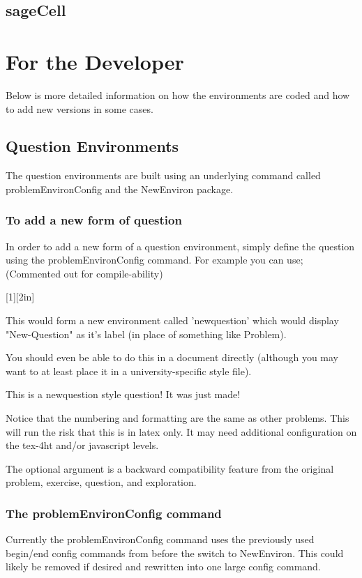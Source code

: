 \documentclass{ximera}
\begin{document}
\subsection{sageCell}

\newpage
\section{For the Developer}
Below is more detailed information on how the environments are coded and how to add new versions in some cases.

\subsection{Question Environments}
The question environments are built using an underlying command called problemEnvironConfig and the NewEnviron package. 

\subsubsection{To add a new form of question}
In order to add a new form of a question environment, simply define the question using the problemEnvironConfig command. For example you can use; (Commented out for compile-ability)

[1][2in]
{
}

This would form a new environment called 'newquestion' which would display "New-Question" as it's label (in place of something like Problem).

You should even be able to do this in a document directly (although you may want to at least place it in a university-specific style file).

\begin{newquestion}
This is a newquestion style question! It was just made!
\end{newquestion}

Notice that the numbering and formatting are the same as other problems. This will run the risk that this is in latex only. It may need additional configuration on the tex-4ht and/or javascript levels.

The optional argument is a backward compatibility feature from the original problem, exercise, question, and exploration.

\subsubsection{The problemEnvironConfig command}
Currently the problemEnvironConfig command uses the previously used begin/end config commands from before the switch to NewEnviron. This could likely be removed if desired and rewritten into one large config command.
\end{document}
